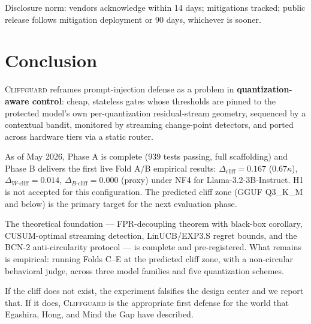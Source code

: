 \documentclass[11pt,a4paper]{article}
\newcommand{\cliff}{\Delta_{\mathrm{cliff}}}
\newcommand{\wcliff}{\Delta_{W\text{-cliff}}}
\newcommand{\bcliff}{\Delta_{B\text{-cliff}}}
\newcommand{\kap}{\kappa}
\newcommand{\CG}{\textsc{Cliffguard}}
\begin{document}
Disclosure norm: vendors acknowledge within 14 days; mitigations tracked; public
release follows mitigation deployment or 90 days, whichever is sooner.

\section{Conclusion}
\label{sec:conclusion}

\CG{} reframes prompt-injection defense as a problem in
\textbf{quantization-aware control}: cheap, stateless gates whose thresholds are
pinned to the protected model's own per-quantization residual-stream geometry,
sequenced by a contextual bandit, monitored by streaming change-point detectors,
and ported across hardware tiers via a static router.

As of May 2026, Phase A is complete (939 tests passing, full scaffolding) and
Phase B delivers the first live Fold A/B empirical results:
$\cliff = 0.167$ ($0.67\kap$), $\wcliff = 0.014$, $\bcliff = 0.000$ (proxy)
under NF4 for Llama-3.2-3B-Instruct.
H1 is not accepted for this configuration.
The predicted cliff zone (GGUF Q3\_K\_M and below) is the primary target for
the next evaluation phase.

The theoretical foundation --- FPR-decoupling theorem with black-box corollary,
CUSUM-optimal streaming detection, LinUCB/EXP3.S regret bounds, and the
BCN-2 anti-circularity protocol --- is complete and pre-registered.
What remains is empirical: running Folds C--E at the predicted cliff zone,
with a non-circular behavioral judge, across three model families and five
quantization schemes.

If the cliff does not exist, the experiment falsifies the design center and
we report that.
If it does, \CG{} is the appropriate first defense for the world that
Egashira, Hong, and Mind the Gap have described.



\end{document}
